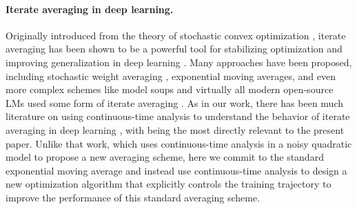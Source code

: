 \paragraph{Iterate averaging in deep learning.} Originally introduced from the theory of stochastic convex optimization \citep{ruppert1988efficient,polyak1992acceleration}, iterate averaging has been shown to be a powerful tool for stabilizing optimization and improving generalization in deep learning \citep{izmailov2018averaging,kaddour2022stop,block2025ema,block2024butterfly,busbridge2023scale}.  Many approaches have been proposed, including stochastic weight averaging \citep{izmailov2018averaging}, exponential moving averages, and even more complex schemes like model soups \citep{wortsman2022model} and virtually all modern open-source LMs used some form of iterate averaging \citep{smollm2,olmo20242,lambert2024tulu}.  As in our work, there has been much literature on using continuous-time analysis to understand the behavior of iterate averaging in deep learning \citep{busbridge2023scale,mandt2015continuous,malladi2022sdes,block2024butterfly}, with \citet{block2025ema} being the most directly relevant to the present paper.  Unlike that work, which uses continuous-time analysis in a noisy quadratic model to propose a new averaging scheme, here we commit to the standard exponential moving average and instead use continuous-time analysis to design a new optimization algorithm that explicitly controls the training trajectory to improve the performance of this standard averaging scheme.

